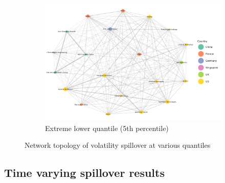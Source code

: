\documentclass[
  letterpaper,
  DIV=11,
  numbers=noendperiod]{scrartcl}
\begin{document}
\begin{figure}
{\begin{figure}[H]
\end{figure}

\begin{figure}[H]

{\centering \includegraphics[width=6.75in,height=\textheight]{plots/fig-vol5.png}

}

\caption{Extreme lower quantile (5th percentile)}

\end{figure}

}

\caption{\label{fig-vol}Network topology of volatility spillover at
various quantiles}

\end{figure}

\hypertarget{time-varying-spillover-results}{%
\subsection{Time varying spillover
results}\label{time-varying-spillover-results}}
\end{document}
